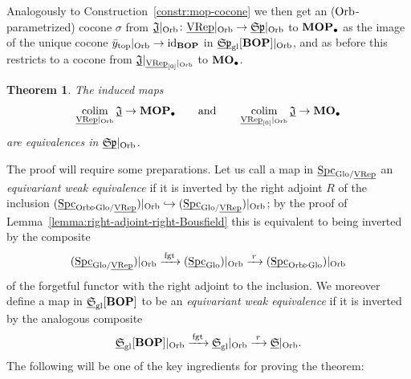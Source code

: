 \documentclass[reqno]{memo-l}
\theoremstyle{mythm}
\newtheorem{thm}{Theorem}[section]
\theoremstyle{definition}
\numberwithin{equation}{section}
\newcommand{\gl}{\textup{gl}}
\DeclareMathOperator{\Spc}{Spc}
\renewcommand{\top}{{\textup{top}}}
\newcommand{\cat}[1]{\textbf{\textup{#1}}}
\newcommand{\colim}{\mathop{\textup{colim}}}
\newcommand{\id}{\textup{id}}
\newcommand{\fgt}{\textup{fgt}}
\newcommand{\Orb}{{\vphantom{\textup{t}}\smash{\textup{Orb}}}}
\newcommand{\Glo}{\textup{Glo}}
\newcommand{\ulhelper}[2]{\underline{\setbox0=\hbox{$#1#2$}\dp0=0.4pt \box0\relax}}
\newcommand{\ul}[1]{{\mathpalette\ulhelper{#1}}\hbox{\rule[-2pt]{0pt}{0pt}}}
\newcommand{\mySp}{{\mathfrak S\kern-.5pt\mathfrak p}}
\newcommand{\myS}{{{\mathfrak S\kern-.4pt}}}
\newcommand{\VRep}{\textup{VRep}}
\begin{document}
Analogously to Construction~\ref{constr:mop-cocone} we then get an ($\Orb$-parametrized) cocone $\sigma$ from $\ul{\mathfrak J}|_{\Orb}\colon\ul\VRep|_{\Orb}\to\ul\mySp|_{\Orb}$ to $\cat{MOP}_\bullet$ as the image of the unique cocone $\bar y_\top|_{\Orb}\to\id_{\cat{BOP}}$ in $\ul\mySp_\gl[\cat{BOP}]|_{\Orb}$, and as before this restricts to a cocone from $\ul{\mathfrak J}|_{\ul\VRep_{[0]}|_{\Orb}}$ to $\cat{MO}_\bullet$.

\begin{thm}\label{thm:MOP-Orb-colim}
    The induced maps
    \[
        \colim_{\ul\VRep|_{\Orb}}\ul{\mathfrak J}\to\cat{MOP}_\bullet\qquad\text{and}\qquad
        \colim_{\ul\VRep_{[0]}|_{\Orb}}\ul{\mathfrak J}\to\cat{MO}_\bullet
    \]
    are equivalences in $\ul\mySp|_{\Orb}$.
\end{thm}

The proof will require some preparations. Let us call a map in $\ul\Spc_{\Glo/\ul\VRep}$ an \emph{equivariant weak equivalence} if it is inverted by the right adjoint $R$ of the inclusion $(\ul\Spc_{\Orb\triangleright\Glo/\ul\VRep})|_\Orb\hookrightarrow(\ul\Spc_{\Glo/\ul\VRep})|_\Orb$; by the proof of Lemma~\ref{lemma:right-adjoint-right-Bousfield} this is equivalent to being inverted by the composite
\[
    (\ul\Spc_{\Glo/\ul\VRep})|_\Orb\xrightarrow{\,\fgt\,}(\ul\Spc_{\Glo})|_\Orb\xrightarrow{\;r\;}(\ul\Spc_{\Orb\triangleright\Glo})|_{\Orb}
\]
of the forgetful functor with the right adjoint to the inclusion. We moreover define a map in $\ul\myS_\gl[\cat{BOP}]$ to be an \emph{equivariant weak equivalence} if it is inverted by the analogous composite
\[
    \ul\myS_\gl[\cat{BOP}]|_\Orb\xrightarrow{\,\fgt\,}\ul\myS_\gl|_\Orb\xrightarrow{\;r\;}\ul\myS|_\Orb.
\] 
The following will be one of the key ingredients for proving the theorem:
\end{document}

